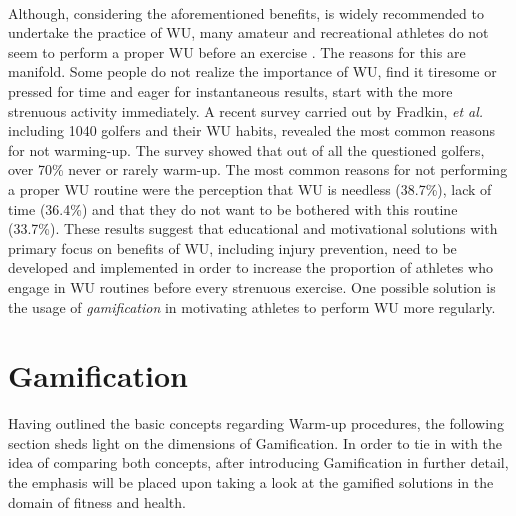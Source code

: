 \\Although, considering the aforementioned benefits, is widely recommended to undertake the practice of WU, many amateur and recreational athletes do not seem to perform a proper WU before an exercise \cite{fradkin2010effects}. The reasons for this are manifold. Some people do not realize the importance of WU, find it tiresome or pressed for time and eager for instantaneous results, start with the more strenuous activity immediately. A recent survey carried out by Fradkin, \textit{et al.} including 1040 golfers and their WU habits, revealed the most common reasons for not warming-up. The survey showed that out of all the questioned golfers, over 70\% never or rarely warm-up. The most common reasons for not performing a proper WU routine were the perception that WU is needless (38.7\%), lack of time (36.4\%) and that they do not want to be bothered with this routine (33.7\%).
These results suggest that educational and motivational solutions with primary focus on benefits of WU, including injury prevention, need to be developed and implemented in order to increase the proportion of athletes who engage in WU routines before every strenuous exercise. One possible solution is the usage of \textit{gamification} in motivating athletes to perform WU more regularly. 
\pagebreak
\section{Gamification}
Having outlined the basic concepts regarding Warm-up procedures, the following section sheds light 
on the dimensions of Gamification. In order to tie in with the idea of comparing both concepts, after  introducing Gamification in further detail, the emphasis will be placed upon taking a look at the 
gamified solutions in the domain of fitness and health. 
